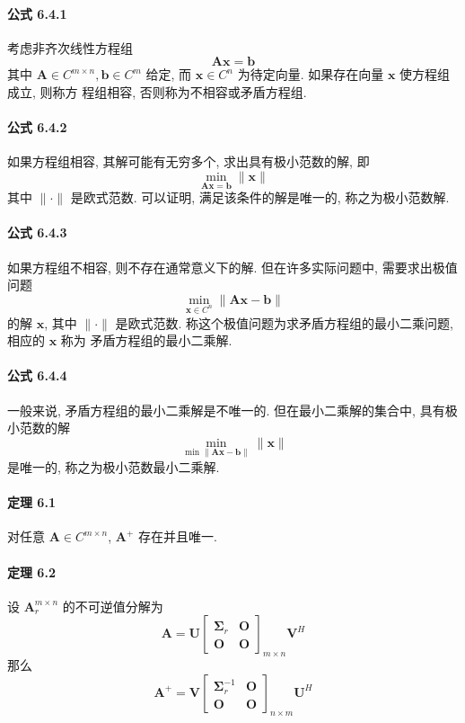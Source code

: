 \documentclass[12pt, a4paper, oneside, fontset=none]{ctexart}
\begin{document}
\paragraph*{公式 6.4.1} 考虑非齐次线性方程组
$$
    \bm{Ax} = \bm{b}
$$
其中 $\bm{A} \in C^{m\times n}, \bm{b} \in C^m$ 给定, 而 $\bm{x} \in C^n$ 为待定向量. 如果存在向量 $\bm{x}$ 使方程组成立, 则称方
程组相容, 否则称为不相容或矛盾方程组.

\paragraph*{公式 6.4.2} 如果方程组相容, 其解可能有无穷多个, 求出具有极小范数的解, 即
$$
    \min\limits_{\bm{Ax} = \bm{b}} \lVert \bm{x} \rVert
$$
其中 $\lVert \bm{\cdot} \rVert$ 是欧式范数. 可以证明, 满足该条件的解是唯一的, 称之为极小范数解.

\paragraph*{公式 6.4.3} 如果方程组不相容, 则不存在通常意义下的解. 但在许多实际问题中, 需要求出极值问题
$$
    \min\limits_{\bm{x} \in C^n} \lVert \bm{Ax} - \bm{b} \rVert
$$
的解 $\bm{x}$, 其中 $\lVert \bm{\cdot} \rVert$ 是欧式范数. 称这个极值问题为求矛盾方程组的最小二乘问题, 相应的 $\bm{x}$ 称为
矛盾方程组的最小二乘解.

\paragraph*{公式 6.4.4} 一般来说, 矛盾方程组的最小二乘解是不唯一的. 但在最小二乘解的集合中, 具有极小范数的解
$$
    \min\limits_{\min \lVert \bm{Ax} - \bm{b} \rVert} \lVert \bm{x} \rVert
$$
是唯一的, 称之为极小范数最小二乘解.

\paragraph*{定理 6.1} 对任意 $\bm{A} \in C^{m\times n}$, $\bm{A}^+$ 存在并且唯一.

\paragraph*{定理 6.2} 设 $\bm{A}^{m\times n}_r$ 的不可逆值分解为
$$
    \bm{A} = \bm{U} \begin{bmatrix}
        \bm{\Sigma}_r & \bm{O} \\
        \bm{O}        & \bm{O}
    \end{bmatrix}_{m\times n} \bm{V}^H
$$
那么
$$
    \bm{A}^+ = \bm{V}\begin{bmatrix}
        \bm{\Sigma}^{-1}_r & \bm{O} \\
        \bm{O}             & \bm{O}
    \end{bmatrix}_{n\times m} \bm{U}^H
$$
\end{document}
